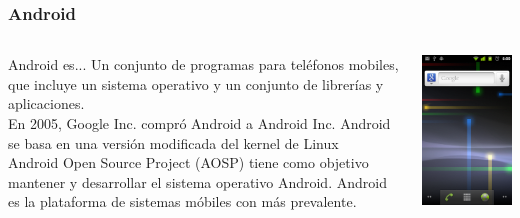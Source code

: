 \documentclass[colorlinks,10pt]{beamer}
\begin{document}
\begin{frame}
  \frametitle{Android}
  
  \begin{columns}
    \begin{column}{0.6\textwidth}
      \begin{block}{Android es...}
        Un conjunto de programas para teléfonos mobiles, que incluye un sistema operativo y un conjunto de librerías y aplicaciones.\\
        En 2005, Google Inc. compró Android a Android Inc. Android se basa en una versión modificada del kernel de Linux\\ 
        Android Open Source Project (AOSP) tiene como objetivo mantener y desarrollar el sistema operativo Android. Android es la plataforma de sistemas móbiles con más prevalente. 
      \end{block}
    \end{column}
    \begin{column}{0.4\textwidth}
        \begin{center}
    \includegraphics[width=0.9\columnwidth]{figs/android} \\
  \end{center}
    \end{column}
  \end{columns}
\end{frame}
\end{document}
